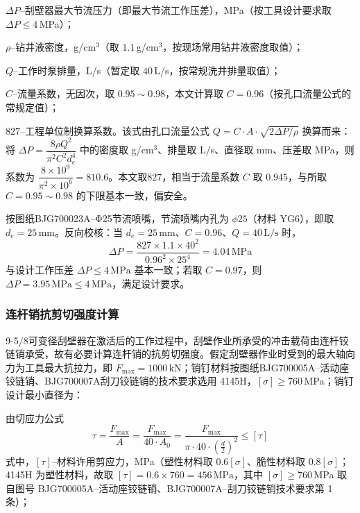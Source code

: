 $\Delta P$--刮壁器最大节流压力（即最大节流工作压差），MPa（按工具设计要求取 $\Delta P \le 4$\,MPa）；

$\rho$--钻井液密度，g/cm$^3$（取 $1.1$\,g/cm$^3$，按现场常用钻井液密度取值）；

$Q$--工作时泵排量，L/s（暂定取 $40$\,L/s，按常规洗井排量取值）；

$C$--流量系数，无因次，取 $0.95 \sim 0.98$，本文计算取 $C = 0.96$（按孔口流量公式的常规定值）；

$827$--工程单位制换算系数。该式由孔口流量公式 $Q = C \cdot A \cdot \sqrt{2\Delta P/\rho}$ 换算而来：将 $\Delta P = \dfrac{8\rho Q^2}{\pi^2 C^2 d_e^4}$ 中的密度取 g/cm$^3$、排量取 L/s、直径取 mm、压差取 MPa，则系数为 $\dfrac{8\times 10^{9}}{\pi^2\times 10^{6}} = 810.6$。本文取$827$，相当于流量系数 $C$ 取 $0.945$，与所取 $C = 0.95\sim0.98$ 的下限基本一致，偏安全。

按图纸BJG700023A--Φ25节流喷嘴，节流喷嘴内孔为 $\phi 25$（材料 YG6），即取 $d_e = 25\,\mathrm{mm}$。反向校核：当 $d_e = 25\,\mathrm{mm}$、$C = 0.96$、$Q = 40\,\mathrm{L/s}$ 时，
\begin{equation}
    \Delta P = \frac{827 \times 1.1 \times 40^2}{0.96^2 \times 25^4} = 4.04\,\mathrm{MPa}
\end{equation}
与设计工作压差 $\Delta P \le 4\,\mathrm{MPa}$ 基本一致；若取 $C = 0.97$，则 $\Delta P = 3.95\,\mathrm{MPa} \le 4\,\mathrm{MPa}$，满足设计要求。


\subsubsection{连杆销抗剪切强度计算}

9-5/8\inch 可变径刮壁器在激活后的工作过程中，刮壁作业所承受的冲击载荷由连杆铰链销承受，故有必要计算连杆销的抗剪切强度。假定刮壁器作业时受到的最大轴向力为工具最大抗拉力，即 $F_{\max} = 1000\,\mathrm{kN}$；销钉材料按图纸BJG700005A--活动座铰链销、BJG700007A刮刀铰链销的技术要求选用 4145H，$[\sigma] \ge 760\,\mathrm{MPa}$；销钉设计最小直径为：

由切应力公式
\begin{equation}
    \tau = \frac{F_{\max}}{A} = \frac{F_{\max}}{40 \cdot A_0} = \frac{F_{\max}}{\pi \cdot 40 \cdot \left(\frac{d}{2}\right)^2} \le [\tau]
\end{equation}
式中，$[\tau]$--材料许用剪应力，MPa（塑性材料取 $0.6[\sigma]$、脆性材料取 $0.8[\sigma]$；4145H 为塑性材料，故取 $[\tau] = 0.6 \times 760 = 456\,\mathrm{MPa}$，其中 $[\sigma] \ge 760$\,MPa 取自图号 BJG700005A--活动座铰链销、BJG700007A--刮刀铰链销技术要求第 1 条）；

